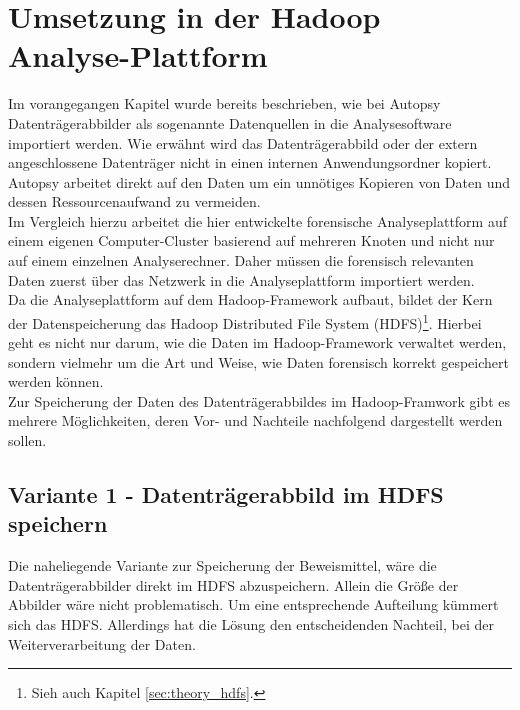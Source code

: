 \section{Umsetzung in der Hadoop Analyse-Plattform}

Im vorangegangen Kapitel wurde bereits beschrieben, wie bei Autopsy Datenträgerabbilder als sogenannte Datenquellen in die Analysesoftware importiert werden. Wie erwähnt wird das Datenträgerabbild oder der extern angeschlossene Datenträger nicht in einen internen Anwendungsordner kopiert. Autopsy arbeitet direkt auf den Daten um ein unnötiges Kopieren von Daten und dessen Ressourcenaufwand zu vermeiden. \\

\noindent
Im Vergleich hierzu arbeitet die hier entwickelte forensische Analyseplattform auf einem eigenen Computer-Cluster basierend auf mehreren Knoten und nicht nur auf einem einzelnen Analyserechner. Daher müssen die forensisch relevanten Daten zuerst über das Netzwerk in die Analyseplattform importiert werden. \\
Da die Analyseplattform auf dem Hadoop-Framework aufbaut, bildet der Kern der Datenspeicherung das Hadoop Distributed File System (HDFS)\footnote{Sieh auch Kapitel \ref{sec:theory_hdfs}.}. Hierbei geht es nicht nur darum, wie die Daten im Hadoop-Framework verwaltet werden, sondern vielmehr um die Art und Weise, wie Daten forensisch korrekt gespeichert werden können.\\


\noindent
Zur Speicherung der Daten des Datenträgerabbildes im Hadoop-Framwork gibt es mehrere Möglichkeiten, deren Vor- und Nachteile nachfolgend dargestellt werden sollen.

\subsection{Variante 1 - Datenträgerabbild im HDFS speichern}

Die naheliegende Variante zur Speicherung der Beweismittel, wäre die Datenträgerabbilder direkt im HDFS abzuspeichern. Allein die Größe der Abbilder wäre nicht problematisch. Um eine entsprechende Aufteilung kümmert sich das HDFS. Allerdings hat die Lösung den entscheidenden Nachteil, bei der Weiterverarbeitung der Daten.\\ 

